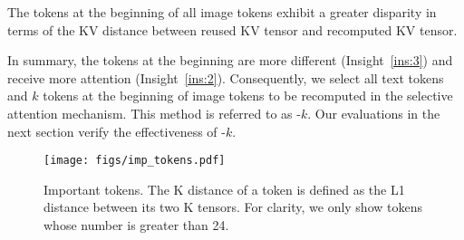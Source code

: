 \begin{insight}\label{ins:3}
    The tokens at the beginning of all image tokens exhibit a greater disparity in terms of the KV distance between reused KV tensor and recomputed KV tensor.
\end{insight}

In summary, the tokens at the beginning are more different (Insight~\ref{ins:3}) and receive more attention (Insight~\ref{ins:2}). Consequently, we select all text tokens and $k$ tokens at the beginning of image tokens to be recomputed in the selective attention mechanism. This method is referred to as \sys-$k$. Our evaluations in the next section verify the effectiveness of \sys-$k$.

\begin{figure}
    \centering
    \texttt{[image: figs/imp\_tokens.pdf]}
    \caption{Important tokens. The K distance of a token is defined as the L1 distance between its two K tensors. For clarity, we only show tokens whose number is greater than 24.}
    \label{fig:imp_tokens}
\end{figure}